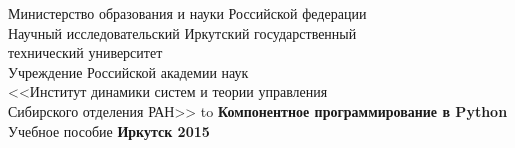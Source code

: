 \documentclass[14pt,a4paper,openany,twoside,final]{extbook}
\begin{document}

\begin{titlepage}
\thispagestyle{empty}
\begin{center}{\small{}
Министерство образования и науки
Российской федерации \\
Научный исследовательский Иркутский государственный\\ технический университет\\[2ex]
    Учреждение Российской академии наук \\
<<Институт динамики систем и теории управления \\
Сибирского отделения РАН>>
}
\vfill
\hbox to \linewidth{\hfill\bfseries Е.~А.~Черкашин, М.~Байджу\hfill}
 \vspace{2em}
{\large\bfseries Компонентное программирование в Python%
}\\
 \vspace{2em}
{Учебное пособие}
\vfill
\vfill
 \textbf{Иркутск 2015}
\end{center}
\end{titlepage}



\end{document}
